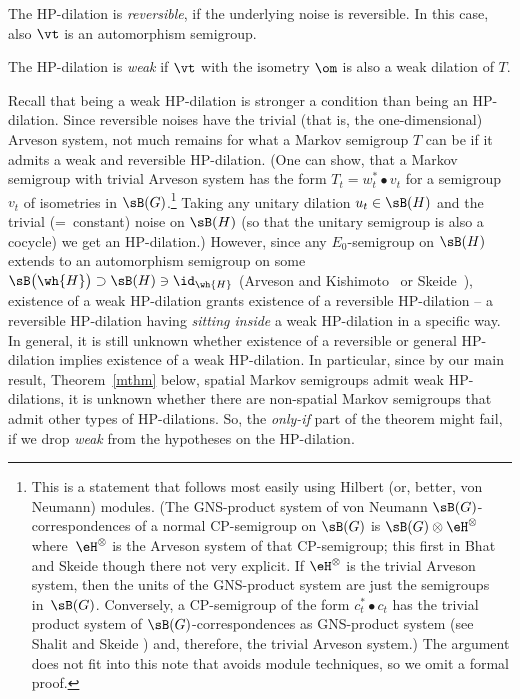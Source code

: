 The HP-dilation is \emph{reversible}, if the underlying noise is reversible. In this case, also $\vt$ is an automorphism semigroup.

The HP-dilation is \emph{weak} if $\vt$ with the isometry $\om$ is also a weak dilation of $T$.
\edefi

\bob \label{wob}
Recall that being a weak HP-dilation is stronger a condition than being an HP-dilation. Since reversible noises have the trivial (that is, the one-dimensional) Arveson system, not much remains for what a Markov semigroup $T$ can be if it admits a weak and reversible HP-dilation. (One can show, that a Markov semigroup with trivial Arveson system has the form $T_t=w_t^*\bullet v_t$ for a semigroup $v_t$ of isometries in $\sB(G)$.\footnote{This is a statement that follows most easily using Hilbert (or, better, von Neumann) modules. (The GNS-product system of von Neumann $\sB(G)$-correspondences of a normal CP-semigroup on $\sB(G)$ is $\sB(G)\otimes\eH^\otimes$ where~$\eH^\otimes$ is the Arveson system of that CP-semigroup; this first in Bhat and Skeide \cite[Section 13]{BhSk00} though there not very explicit. If $\eH^\otimes$ is the trivial Arveson system, then the units of the GNS-product system are just the semigroups in~$\sB(G)$. Conversely, a CP-semigroup of the form $c_t^*\bullet c_t$ has the trivial product system of $\sB(G)$-correspondences as GNS-product system (see Shalit and Skeide \cite[Observation~7.2]{ShaSk10p}) and, therefore, the trivial Arveson system.) The argument does not fit into this note that avoids module techniques, so we omit a formal proof.}
Taking any unitary dilation $u_t\in\sB(H)$ and the trivial (=~constant) noise on $\sB(H)$ (so that the unitary semigroup is also a cocycle) we get an HP-dilation.) However, since any $E_0$-semigroup on $\sB(H)$ extends to an automorphism semigroup on some $\sB\big(\wh{H}\big)\supset\sB(H)\ni\id_{\wh{H}}$ (Arveson and Kishimoto~\cite{ArKi92} or Skeide~\cite{Ske07a}), existence of a weak HP-dilation grants existence of a reversible HP-dilation -- a reversible HP-dilation having {\it sitting inside} a weak HP-dilation in a specific way. In general, it is still unknown whether existence of a reversible or general HP-dilation implies existence of a weak HP-dilation. In particular, since by our main result, Theorem~\ref{mthm} below, spatial Markov semigroups admit weak HP-dilations, it is unknown whether there are non-spatial Markov semigroups that admit other types of HP-dilations. So, the {\it only-if} part of the theorem might fail, if we drop {\it weak} from the hypotheses on the HP-dilation.
\eob

